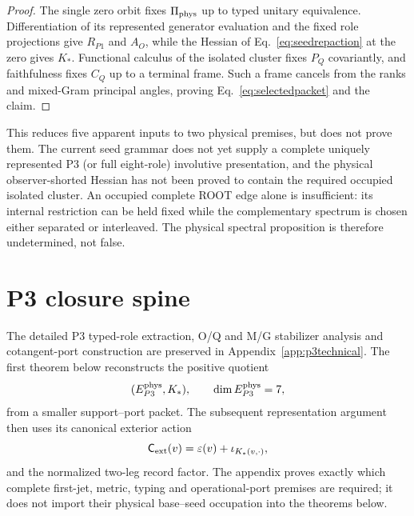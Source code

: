\documentclass[11pt]{article}
\begin{document}
\begin{proof}
The single zero orbit fixes $\Pi_{\rm phys}$ up to typed unitary equivalence.
Differentiation of its represented generator evaluation and the fixed role
projections give $R_{P1}$ and $A_O$, while the Hessian of
Eq.~\eqref{eq:seedrepaction} at the zero gives $K_*$.  Functional calculus of
the isolated cluster fixes $P_Q$ covariantly, and faithfulness fixes $C_Q$ up
to a terminal frame.  Such a frame cancels from the ranks and mixed-Gram
principal angles, proving Eq.~\eqref{eq:selectedpacket} and the claim.
\end{proof}

This reduces five apparent inputs to two physical premises, but does not
prove them.  The current seed grammar does not yet supply a complete uniquely
represented P3 (or full eight-role) involutive presentation, and the physical
observer-shorted Hessian has not been proved to contain the required occupied
isolated cluster.  An occupied complete ROOT edge alone is insufficient: its
internal restriction can be held fixed while the complementary spectrum is
chosen either separated or interleaved.  The physical spectral proposition is
therefore undetermined, not false.

\section{P3 closure spine}
\label{sec:p3closurespine}

The detailed P3 typed-role extraction, O/Q and M/G stabilizer analysis and
cotangent-port construction are preserved in
Appendix~\ref{app:p3technical}.  The first theorem below reconstructs the
positive quotient
\[
 (E_{P3}^{\rm phys},K_*),\qquad \dim E_{P3}^{\rm phys}=7,
\]
from a smaller support--port packet.  The subsequent representation argument
then uses its canonical exterior action
\[
 \mathsf C_{\rm ext}(v)=\varepsilon(v)
 +\iota_{K_*(v,\cdot)},
\]
and the normalized two-leg record factor.  The appendix proves exactly which
complete first-jet, metric, typing and operational-port premises are required;
it does not import their physical base--seed occupation into the theorems
below.
\end{document}
